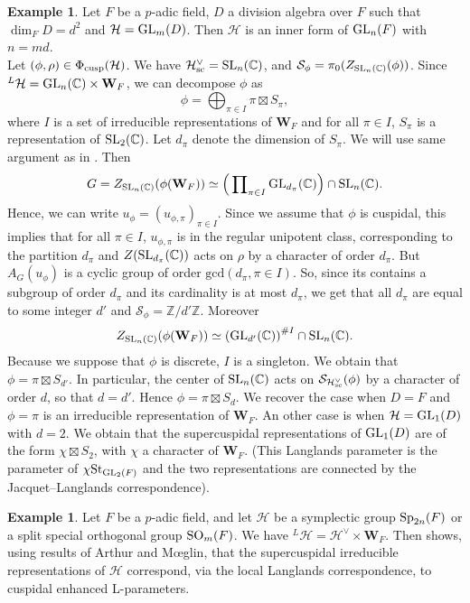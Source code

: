 \documentclass[11pt]{amsart}
\theoremstyle{definition}
\newtheorem{ex}[thm]{Example}
\newcommand{\mb}{\mathbf}
\newcommand{\Z}{\mathbb Z}
\newcommand{\C}{\mathbb C}
\def\SO{{\rm SO}}
\def\Sp{{\rm Sp}}
\def\GL{{\rm GL}}
\def\SL{{\rm SL}}
\def\St{{\rm St}}
\def\cS{{\mathcal S}}
\def\cH{{\mathcal H}}
\def\sc{{\rm sc}}
\def\cusp{{\rm cusp}}
\begin{document}
\begin{ex} \label{ex: cusp 3}
Let $F$ be a $p$-adic field, $D$ a division algebra over $F$ such that $\dim_F D=d^2$ 
and $\cH=\GL_m(D)$. Then $\cH$ is an inner form of $\GL_n(F)$ with $n=md$.\\
Let $(\phi,\rho) \in \Phi_\cusp (\cH)$. We have $\cH^\vee_{\sc}=\SL_n(\C)$, and 
$\cS_\phi=\pi_0(Z_{\SL_{n}(\C)}(\phi))$. Since ${}^{L} \cH=\GL_n(\C) \times \mb W_F$, 
we can decompose $\phi$ as 
\[
\phi = \bigoplus\nolimits_{\pi \in I} \pi \boxtimes S_{\pi},
\]
where $I$ is a set of irreducible representations of $\mb W_F$ and for all $\pi \in I$, 
$S_{\pi}$ is a representation of $\SL_2(\C)$. Let $d_{\pi}$ denote the dimension of 
$S_{\pi}$. We will use same argument as in \cite[p. 247]{Lus1}. Then
\[
G=Z_{\SL_{n}(\C)}(\phi({\mb W_F})) \simeq 
\Big( \prod\nolimits_{\pi \in I} \GL_{d_{\pi}}(\C) \Big) \cap \SL_n(\C).
\]
Hence, we can write $u_{\phi} = (u_{\phi,\pi})_{\pi \in I}$. Since we assume that $\phi$ is 
cuspidal, this implies that for all $\pi \in I$, $u_{\phi,\pi}$ is in the regular unipotent 
class, corresponding to the partition $d_{\pi}$ and $Z(\SL_{d_{\pi}}(\C))$ acts on $\rho$ 
by a character of order $d_{\pi}$. But $A_{G}(u_{\phi})$ is a cyclic group of order 
$\mathrm{gcd}(d_{\pi},\pi \in I)$. So, since its contains a subgroup of order $d_{\pi}$ and 
its cardinality is at most $d_{\pi}$, we get that all $d_{\pi}$ are equal to some integer 
$d'$ and $\cS_\phi=\Z/d'\Z$. Moreover
\[
Z_{\SL_n(\C)}(\phi (\mb W_F)) \simeq \left(\GL_{d'}(\C) \right)^{\# I} \cap \SL_n(\C) .
\]
Because we suppose that $\phi$ is discrete, $I$ is a singleton. We obtain that 
$\phi=\pi \boxtimes S_{d'}$. In particular, the center of $\SL_n(\C)$ acts on 
$\cS_{\cH^{\vee}_{\sc}}(\phi)$ by a character of order $d$, so that $d=d'$. Hence 
$\phi=\pi \boxtimes S_d$. We recover the case when $D=F$ and $\phi=\pi$ is an irreducible 
representation of $\mb W_F$. An other case is when $\cH=\GL_1(D)$ with $d=2$. We obtain that the 
supercuspidal representations of $\GL_1(D)$ are of the form $\chi \boxtimes S_2$, with $\chi$ 
a character of $\mb W_F$. (This Langlands parameter is the parameter of $\chi \St_{\GL_2(F)}$ 
and the two representations are connected by the Jacquet--Langlands correspondence).
\end{ex} 
 
\begin{ex} \label{ex: cusp 4}
Let $F$ be a $p$-adic field, and let $\cH$ be a symplectic group $\Sp_{2n}(F)$ or a split 
special orthogonal group $\SO_{m}(F)$.
We have ${}^{L} \cH=\cH^\vee \times \mb W_F$. Then \cite[Proposition~4.14]{Mou} shows, using 
results of Arthur and M\oe glin, that the supercuspidal irreducible representations of $\cH$ 
correspond, via the local Langlands correspondence, to cuspidal enhanced L-parameters.   
\end{ex}
\end{document}
